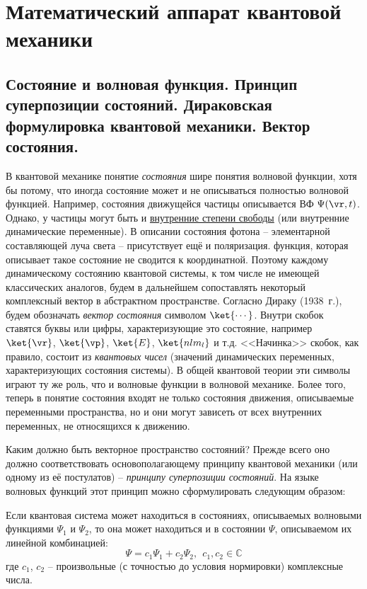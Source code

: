 \chapter{Математический аппарат квантовой механики}

\begin{sloppypar}
  \section{Состояние и волновая функция. Принцип суперпозиции состояний. Дираковская формулировка квантовой механики. Вектор состояния.}
\end{sloppypar}

В квантовой механике понятие {\em состояния} шире понятия волновой функции, хотя бы потому, что иногда состояние может и не описываться полностью волновой функцией. Например, состояния движущейся частицы описывается ВФ $\Psi(\vr, t)$. Однако, у частицы могут быть и \underline{внутренние степени свободы} (или внутренние динамические переменные). В описании состояния фотона -- элементарной составляющей луча света -- присутствует ещё и поляризация. функция, которая описывает такое состояние не сводится к координатной. Поэтому каждому динамическому состоянию квантовой системы, к том числе не имеющей классических аналогов, будем в дальнейшем сопоставлять некоторый комплексный вектор в абстрактном пространстве. Согласно Дираку (1938~г.), будем обозначать {\em вектор состояния} символом $\ket{\cdots}$. Внутри скобок ставятся буквы или цифры, характеризующие это состояние, например $\ket{\vr}$, $\ket{\vp}$, $\ket{E}$, $\ket{nlm_l}$ и т.д. <<Начинка>> скобок, как правило, состоит из {\em квантовых чисел} (значений динамических переменных, характеризующих состояния системы). В общей квантовой теории эти символы играют ту же роль, что и волновые функции в волновой механике. Более того, теперь в понятие состояния входят не только состояния движения, описываемые переменными пространства, но и они могут зависеть от всех внутренних переменных, не относящихся к движению.

Каким должно быть векторное пространство состояний? Прежде всего оно должно соответствовать основополагающему принципу квантовой механики (или одному из её постулатов) -- {\em принципу суперпозиции состояний}. На языке волновых функций этот принцип можно сформулировать следующим образом:
%
\begin{stmt}
Если квантовая система может находиться в состояниях, описываемых волновыми функциями $\Psi_1$ и $\Psi_2$, то она может находиться и в состоянии $\Psi$, описываемом их линейной комбинацией:
$$
\Psi = c_1 \Psi_1 + c_2 \Psi_2, ~~c_1, c_2 \in \mathbb{C}
$$%
%
где $c_1$, $c_2$ -- произвольные (с точностью до условия нормировки) комплексные числа.
\end{stmt}

